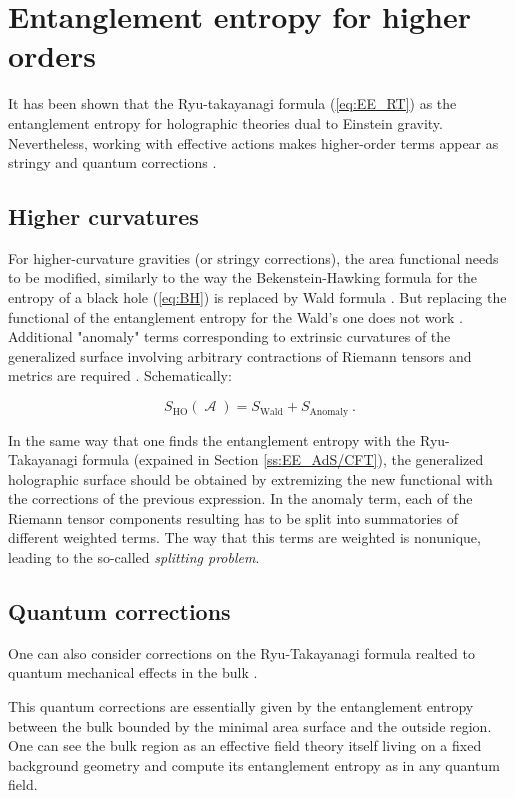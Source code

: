 \documentclass[lettersize,journal]{IEEEtran}
\providecommand{\eq}[2]{
    \begin{equation}
        #2
    \label{eq:#1}
    \end{equation}
}
\DeclareMathOperator{\calA}{\mathcal{A}}
\begin{document}
\section{Entanglement entropy for higher orders} \label{s:EE_HO}

It has been shown that the Ryu-takayanagi formula (\ref{eq:EE_RT}) as the entanglement entropy for holographic theories dual to Einstein gravity. Nevertheless, working with effective actions makes higher-order terms appear as stringy and quantum corrections \cite{bueno_holographic_2021}.


\subsection{Higher curvatures} \label{ss:StringyC}

For higher-curvature gravities (or stringy corrections), the area functional needs to be modified, similarly to the way the Bekenstein-Hawking formula for the entropy of a black hole (\ref{eq:BH}) is replaced by Wald formula \cite{iyer_properties_1994}. But replacing the functional of the entanglement entropy for the Wald's one does not work \cite{bueno_holographic_2021}. Additional "anomaly" terms corresponding to extrinsic curvatures of the generalized surface involving arbitrary contractions of Riemann tensors and metrics are required \cite{dong_holographic_2014}. Schematically:
\eq{EE_HO}{
    S_{\text{HO}}(\calA) = S_{\text{Wald}} + S_{\text{Anomaly}} \ .
}

In the same way that one finds the entanglement entropy with the Ryu-Takayanagi formula (expained in Section \ref{ss:EE_AdS/CFT}), the generalized holographic surface should be obtained by extremizing the new functional with the corrections of the previous expression. In the anomaly term, each of the Riemann tensor components resulting has to be split into summatories of different weighted terms. The way that this terms are weighted is nonunique, leading to the so-called \textit{splitting problem}.


\subsection{Quantum corrections} \label{ss:QuantumC}

One can also consider corrections on the Ryu-Takayanagi formula realted to quantum mechanical effects in the bulk \cite{faulkner_quantum_2013}.

This quantum corrections are essentially given by the entanglement entropy between the bulk bounded by the minimal area surface and the outside region. One can see the bulk region as an effective field theory itself living on a fixed background geometry and compute its entanglement entropy as in any quantum field.
\end{document}
